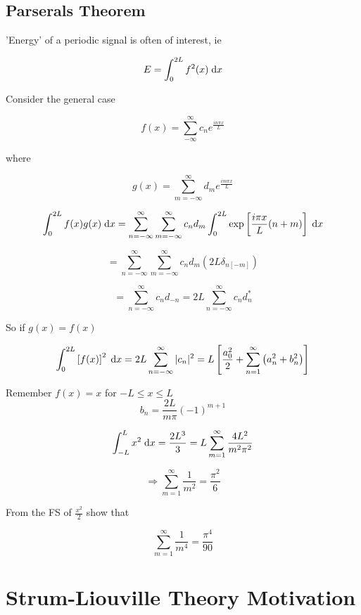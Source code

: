 \documentclass[a4paper]{article}
\begin{document}
\subsection{Parserals Theorem}

'Energy' of a periodic signal is often of interest, ie

\[ E = \int_{0}^{2L} f^{2}(x) \; \mathrm{d} x  \]

Consider the general case 

\[ f(x) = \sum_{-\infty}^{\infty} c_{n} e^{\frac{i n \pi x}{L}} \]

where 

\[ g(x) = \sum_{m = - \infty}^{\infty} d_{m} e^{\frac{i m \pi x}{L}} \]


\[ \int_{0}^{2L} f(x) g(x) \; \mathrm{d} x = \sum_{n = - \infty}^{\infty} \sum_{m = -\infty}^{\infty} c_{n} d_{m} \int_{0}^{2L} \exp \left[  \frac{i \pi x}{L} (n + m) \right]  \; \mathrm{d} x \]

\[ =  \sum_{n = - \infty}^{\infty} \sum_{m = -\infty}^{\infty} c_{n} d_{m} \left( 2L \delta_{n[-m]} \right)  \]

\[ = \sum_{n = -\infty}^{\infty} c_{n} d_{-n} = 2L \sum_{n = -\infty}^{\infty} c_{n} d_{n}^{*} \]


So if $ g(x) = f(x) $

\[ \int_{0}^{2L} \left[  f(x) \right]^{2} \; \mathrm{d} x = 2L \sum_{n = -\infty}^{\infty} | c_{n} |^{2} = L\left[  \frac{a_{0}^{2}}{2} + \sum_{n=1}^{\infty}  \left(a_{n}^{2}  + b_{n}^{2} \right)  \right]  \]


\begin{eg}
	Remember $ f(x) = x $ for $ -L \leq x \leq L $
	\[ b_{n} = \frac{2L}{m \pi}(-1)^{m+1} \]
	
	\[ \int_{-L}^{L} x^{2} \; \mathrm{d} x = \frac{2L^{3}}{3} = L \sum_{m = 1}^{\infty}  \frac{4 L^{2}}{m^{2} \pi^{2}} \]
	
	\[ \Rightarrow \sum_{m=1}^{\infty} \frac{1}{m^{2}} = \frac{\pi^{2}}{6} \]
\end{eg}

\begin{ex}
	From the FS of $ \frac{x^{2}}{2} $ show that
	
	\[ \sum_{m=1}^{\infty} \frac{1}{m^{4}} = \frac{\pi^{4}}{90} \]
\end{ex}

\section{Strum-Liouville Theory Motivation}
\end{document}
